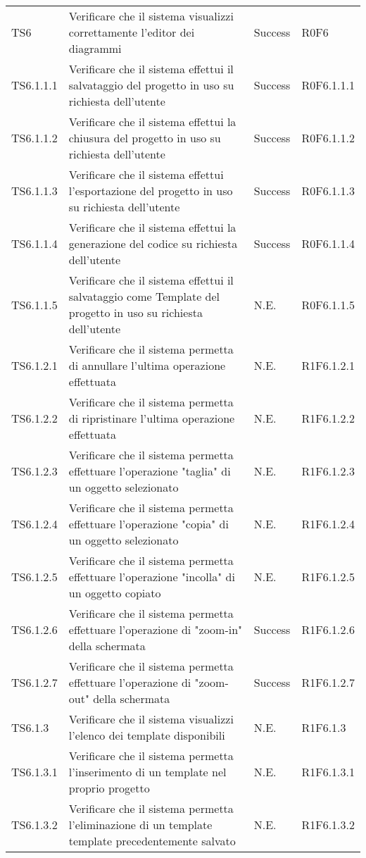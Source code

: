 \begin{longtable}{p{2.5cm}!{\VRule[1pt]}p{6.5cm}!{\VRule[1pt]}p{1cm}!{\VRule[1pt]}p{3cm}}
TS6 & Verificare che il sistema visualizzi correttamente l'editor dei diagrammi & Success & R0F6\\
TS6.1.1.1 & Verificare che il sistema effettui il salvataggio del progetto in uso su richiesta dell'utente & Success & R0F6.1.1.1\\
TS6.1.1.2 & Verificare che il sistema effettui la chiusura del progetto in uso su richiesta dell'utente & Success & R0F6.1.1.2\\
TS6.1.1.3 & Verificare che il sistema effettui l'esportazione del progetto in uso su richiesta dell'utente & Success & R0F6.1.1.3\\
TS6.1.1.4 & Verificare che il sistema effettui la generazione del codice su richiesta dell'utente & Success & R0F6.1.1.4\\
TS6.1.1.5 & Verificare che il sistema effettui il salvataggio come Template del progetto in uso su richiesta dell'utente & N.E. & R0F6.1.1.5\\
TS6.1.2.1 & Verificare che il sistema permetta di annullare l'ultima operazione effettuata & N.E. & R1F6.1.2.1\\
TS6.1.2.2 & Verificare che il sistema permetta di ripristinare l'ultima operazione effettuata & N.E. & R1F6.1.2.2\\
TS6.1.2.3 & Verificare che il sistema permetta effettuare l'operazione "taglia" di un oggetto selezionato & N.E. & R1F6.1.2.3\\
TS6.1.2.4 & Verificare che il sistema permetta effettuare l'operazione "copia" di un oggetto selezionato & N.E. & R1F6.1.2.4\\
TS6.1.2.5 & Verificare che il sistema permetta effettuare l'operazione "incolla" di un oggetto copiato & N.E. & R1F6.1.2.5\\
TS6.1.2.6 & Verificare che il sistema permetta effettuare l'operazione di "zoom-in" della schermata & Success & R1F6.1.2.6\\
TS6.1.2.7 & Verificare che il sistema permetta effettuare l'operazione di "zoom-out" della schermata & Success & R1F6.1.2.7\\
TS6.1.3 & Verificare che il sistema visualizzi l'elenco dei template disponibili & N.E. & R1F6.1.3 \\
TS6.1.3.1 & Verificare che il sistema permetta l'inserimento di un template nel proprio progetto& N.E. & R1F6.1.3.1 \\
TS6.1.3.2 & Verificare che il sistema permetta l'eliminazione di un template template precedentemente salvato & N.E. & R1F6.1.3.2 \\

\end{longtable}
